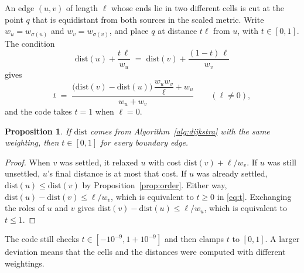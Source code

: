 \documentclass[11pt,a4paper]{article}
\newtheorem{proposition}{Proposition}
\theoremstyle{remark}
\newcommand{\dist}{\mathrm{dist}}
\begin{document}
An edge $(u,v)$ of length $\ell$ whose ends lie in two different cells is cut
at the point $q$ that is equidistant from both sources in the scaled metric.
Write $w_u=w_{\sigma(u)}$ and $w_v=w_{\sigma(v)}$, and place $q$ at distance
$t\ell$ from $u$, with $t\in[0,1]$. The condition
\[
\dist(u) + \frac{t\,\ell}{w_u} \;=\; \dist(v) + \frac{(1-t)\,\ell}{w_v}
\]
gives
\begin{equation}\label{eq:t}
t \;=\; \frac{\bigl(\dist(v)-\dist(u)\bigr)\,\dfrac{w_u w_v}{\ell} + w_u}{w_u+w_v}
\qquad(\ell\neq 0),
\end{equation}
and the code takes $t=1$ when $\ell=0$.

\begin{proposition}\label{prop:t}
If $\dist$ comes from Algorithm~\ref{alg:dijkstra} with the same weighting,
then $t\in[0,1]$ for every boundary edge.
\end{proposition}
\begin{proof}
When $v$ was settled, it relaxed $u$ with cost $\dist(v)+\ell/w_v$. If $u$ was
still unsettled, $u$'s final distance is at most that cost. If $u$ was already
settled, $\dist(u)\le\dist(v)$ by Proposition~\ref{prop:order}. Either way,
$\dist(u)-\dist(v)\le \ell/w_v$, which is equivalent to $t\ge 0$ in
\eqref{eq:t}. Exchanging the roles of $u$ and $v$ gives
$\dist(v)-\dist(u)\le\ell/w_u$, which is equivalent to $t\le 1$.
\end{proof}

The code still checks $t\in[-10^{-9},1+10^{-9}]$ and then clamps $t$ to
$[0,1]$. A larger deviation means that the cells and the distances were
computed with different weightings.
\end{document}
